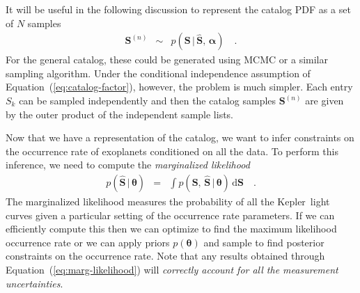 \documentclass[12pt,preprint]{aastex}
\newcommand{\project}[1]{{\sffamily #1}}
\newcommand{\kepler}{\project{Kepler}}
\newcommand{\Eq}[1]{Equation~(\ref{eq:#1})}
\newcommand{\eq}[1]{\Eq{#1}}
\newcommand{\eqlabel}[1]{\label{eq:#1}}
\newcommand{\dd}{\ensuremath{\,\mathrm{d}}}
\newcommand{\bvec}[1]{\ensuremath{\boldsymbol{#1}}}
\newcommand{\ratepars}{{\ensuremath{\bvec{\theta}}}}
\newcommand{\obs}[1]{\ensuremath{\hat{#1}}}
\newcommand{\entry}{\ensuremath{S}}
\newcommand{\catalog}{{\ensuremath{\bvec{\entry}}}}
\newcommand{\interim}{{\ensuremath{\bvec{\alpha}}}}
\begin{document}
It will be useful in the following discussion to represent the catalog PDF as
a set of $N$ samples
\begin{eqnarray}\eqlabel{catalog-samples}
\catalog^{(n)} &\sim& p(\catalog\,|\,\obs{\catalog},\,\interim) \quad.
\end{eqnarray}
For the general catalog, these could be generated using MCMC or a similar
sampling algorithm.
Under the conditional independence assumption of \eq{catalog-factor}, however,
the problem is much simpler.
Each entry $\entry_k$ can be sampled independently and then the catalog
samples $\catalog^{(n)}$ are given by the outer product of the independent
sample lists.

Now that we have a representation of the catalog, we want to infer constraints
on the occurrence rate of exoplanets conditioned on all the data.
To perform this inference, we need to compute the  \emph{marginalized
likelihood}
\begin{eqnarray}\eqlabel{marg-likelihood}
p(\obs{\catalog}\,|\,\ratepars) &=&
\int p(\catalog,\,\obs{\catalog}\,|\,\ratepars) \dd\catalog \quad.
\end{eqnarray}
The marginalized likelihood measures the probability of all the \kepler\ light
curves given a particular setting of the occurrence rate parameters.
If we can efficiently compute this then we can optimize to find the
maximum likelihood occurrence rate or we can apply priors $p(\ratepars)$ and
sample to find posterior constraints on the occurrence rate.
Note that any results obtained through \eq{marg-likelihood} will
\emph{correctly account for all the measurement uncertainties}.
\end{document}
